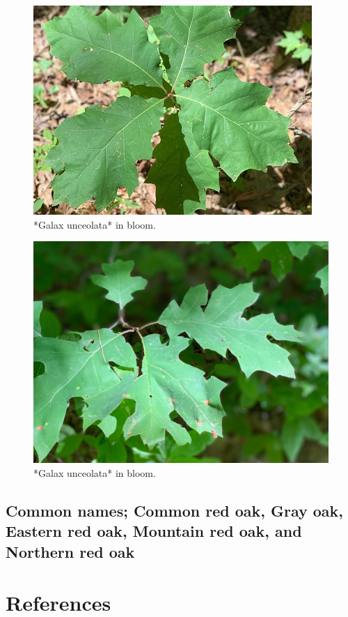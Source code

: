 \documentclass[
]{article}
\begin{document}
\begin{figure}

{\centering \includegraphics[width=0.5\linewidth]{redoak1} 

}

\caption{*Galax unceolata* in bloom.}\label{fig:redoaks-1}
\end{figure}
\begin{figure}

{\centering \includegraphics[width=0.5\linewidth]{redoak} 

}

\caption{*Galax unceolata* in bloom.}\label{fig:redoaks-2}
\end{figure}

\hypertarget{common-names-common-red-oak-gray-oak-eastern-red-oak-mountain-red-oak-and-northern-red-oak}{%
\subsection{Common names; Common red oak, Gray oak, Eastern red oak, Mountain red oak, and Northern red oak}\label{common-names-common-red-oak-gray-oak-eastern-red-oak-mountain-red-oak-and-northern-red-oak}}

\hypertarget{references}{%
\section*{References}\label{references}}
\end{document}
